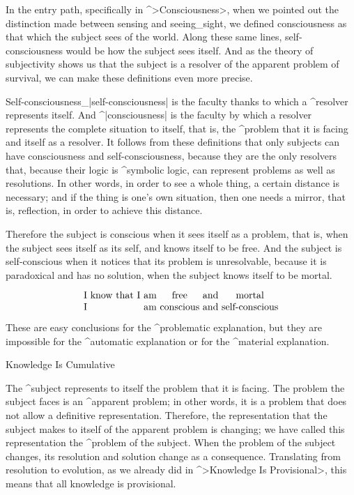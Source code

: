 In the entry path, specifically in ^>Consciousness>, when we pointed out
the distinction made between sensing and seeing_{sight}, we defined
consciousness as that which the subject sees of the world. Along these
same lines, self-consciousness would be how the subject sees itself. And
as the theory of subjectivity shows us that the subject is a resolver of
the apparent problem of survival, we can make these definitions even
more precise.

Self-consciousness_|self-consciousness| is the faculty thanks to which a
^{resolver} represents itself. And ^|consciousness| is the faculty by
which a resolver represents the complete situation to itself, that is,
the ^{problem} that it is facing and itself as a resolver. It follows
from these definitions that only subjects can have consciousness and
self-consciousness, because they are the only resolvers that, because
their logic is ^{symbolic logic}, can represent problems as well as
resolutions. In other words, in order to see a whole thing, a certain
distance is necessary; and if the thing is one's own situation, then one
needs a mirror, that is, reflection, in order to achieve this distance.

Therefore the subject is conscious when it sees itself as a problem,
that is, when the subject sees itself as its self, and knows itself to
be free. And the subject is self-conscious when it notices that its
problem is unresolvable, because it is paradoxical and has no solution,
when the subject knows itself to be mortal.
\par{}\beginpoints
$$\vbox{\halign{&\hfil#\hfil\cr
  I &know that I &am & free & and & mortal\cr
  I &&am & conscious & and & self-conscious\cr}}$$
\endpoints

These are easy conclusions for the ^{problematic explanation}, but they
are impossible for the ^{automatic explanation} or for the ^{material
explanation}.


\Section Knowledge Is Cumulative

The ^{subject} represents to itself the problem that it is facing. The
problem the subject faces is an ^{apparent problem}; in other words, it
is a problem that does not allow a definitive representation. Therefore,
the representation that the subject makes to itself of the apparent
problem is changing; we have called this representation the ^{problem of
the subject}. When the problem of the subject changes, its resolution
and solution change as a consequence. Translating from resolution to
evolution, as we already did in ^>Knowledge Is Provisional>, this means
that all knowledge is provisional.

